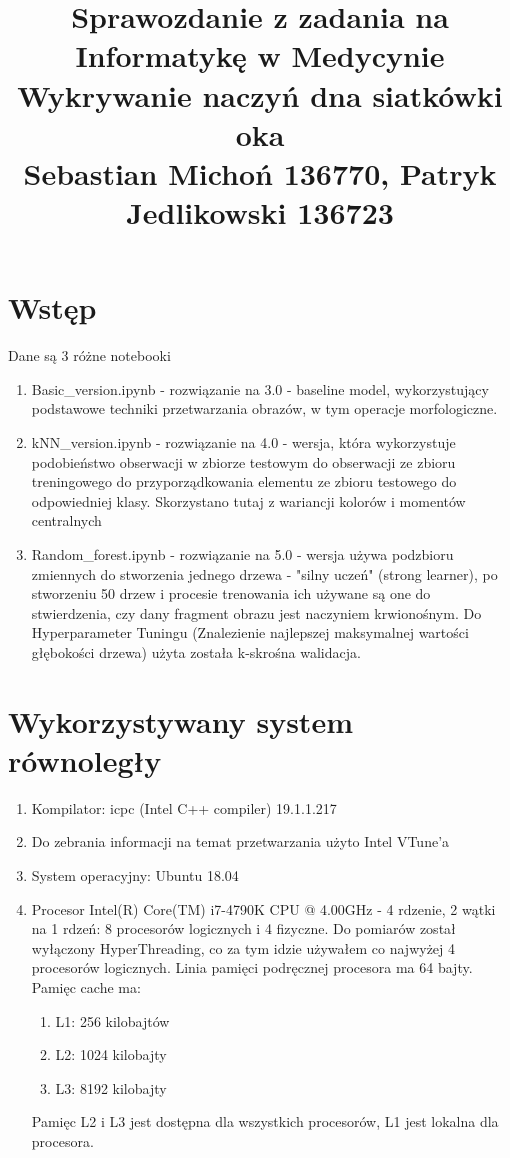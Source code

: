 \documentclass[12pt]{article}
\begin{document}
\title{Sprawozdanie z zadania na Informatykę w Medycynie\\
\large Wykrywanie naczyń dna siatkówki oka\\
\large Sebastian Michoń 136770, Patryk Jedlikowski 136723}
\date{\vspace{-10ex}}
\maketitle

\section{Wstęp}
Dane są 3 różne notebooki
\begin {enumerate}
\item Basic\_version.ipynb - rozwiązanie na 3.0 - baseline model, wykorzystujący podstawowe techniki przetwarzania obrazów, w tym operacje morfologiczne.
\item kNN\_version.ipynb - rozwiązanie na 4.0 - wersja, która wykorzystuje podobieństwo obserwacji w zbiorze testowym do obserwacji ze zbioru treningowego do przyporządkowania elementu ze zbioru testowego do odpowiedniej klasy. Skorzystano tutaj z wariancji kolorów i momentów centralnych
\item Random\_forest.ipynb - rozwiązanie na 5.0 - wersja używa podzbioru zmiennych do stworzenia jednego drzewa - "silny uczeń" (strong learner), po stworzeniu 50 drzew i procesie trenowania ich używane są one do stwierdzenia, czy dany fragment obrazu jest naczyniem krwionośnym. Do Hyperparameter Tuningu (Znalezienie najlepszej maksymalnej wartości głębokości drzewa) użyta została k-skrośna walidacja.
\end {enumerate}

\section{Wykorzystywany system równoległy}
\begin {enumerate}
	\item Kompilator: icpc (Intel C++ compiler) 19.1.1.217
	\item Do zebrania informacji na temat przetwarzania użyto Intel VTune'a
	\item System operacyjny: Ubuntu 18.04
	\item Procesor Intel(R) Core(TM) i7-4790K CPU @ 4.00GHz - 4 rdzenie, 2 wątki na 1 rdzeń: 8 procesorów logicznych i 4 fizyczne. Do pomiarów został wyłączony HyperThreading, co za tym idzie używałem co najwyżej 4 procesorów logicznych. Linia pamięci podręcznej procesora ma 64 bajty. Pamięc cache ma: 
	\begin{enumerate}
		\item L1: 256 kilobajtów
		\item L2: 1024 kilobajty
		\item L3: 8192 kilobajty
	\end{enumerate}
	Pamięc L2 i L3 jest dostępna dla wszystkich procesorów, L1 jest lokalna dla procesora.
	
\end {enumerate}
\end{document}

